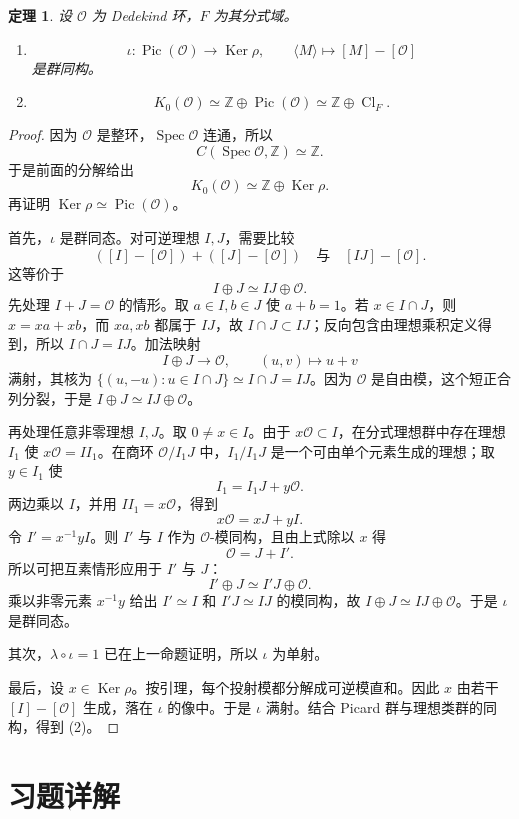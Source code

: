 \documentclass[11pt,a4paper,openany]{ctexbook}
\numberwithin{equation}{chapter}
\newcommand{\Z}{\mathbb{Z}}
\newcommand{\Spec}{\operatorname{Spec}}
\newcommand{\Cl}{\operatorname{Cl}}
\newcommand{\Pic}{\operatorname{Pic}}
\newcommand{\Ker}{\operatorname{Ker}}
\theoremstyle{plain}
\newtheorem{theorem}{定理}[chapter]
\theoremstyle{definition}
\theoremstyle{remark}
\begin{document}
\begin{theorem}
设 $\mathcal O$ 为 Dedekind 环，$F$ 为其分式域。
\begin{enumerate}[label=(\arabic*)]
\item
\[
\iota:\Pic(\mathcal O)\to\Ker\rho,\qquad
\langle M\rangle\mapsto[M]-[\mathcal O]
\]
是群同构。
\item
\[
K_0(\mathcal O)\simeq\Z\oplus\Pic(\mathcal O)
\simeq\Z\oplus\Cl_F.
\]
\end{enumerate}
\end{theorem}

\begin{proof}
因为 $\mathcal O$ 是整环，$\Spec\mathcal O$ 连通，所以
\[
C(\Spec\mathcal O,\Z)\simeq\Z.
\]
于是前面的分解给出
\[
K_0(\mathcal O)\simeq\Z\oplus\Ker\rho.
\]
再证明 $\Ker\rho\simeq\Pic(\mathcal O)$。

首先，$\iota$ 是群同态。对可逆理想 $I,J$，需要比较
\[
([I]-[\mathcal O])+([J]-[\mathcal O])
\quad\text{与}\quad
[IJ]-[\mathcal O].
\]
这等价于
\[
I\oplus J\simeq IJ\oplus\mathcal O.
\]
先处理 $I+J=\mathcal O$ 的情形。取 $a\in I,b\in J$ 使 $a+b=1$。若
$x\in I\cap J$，则 $x=xa+xb$，而 $xa,xb$ 都属于 $IJ$，故
$I\cap J\subset IJ$；反向包含由理想乘积定义得到，所以 $I\cap J=IJ$。加法映射
\[
I\oplus J\longrightarrow\mathcal O,\qquad (u,v)\longmapsto u+v
\]
满射，其核为 $\{(u,-u):u\in I\cap J\}\simeq I\cap J=IJ$。因为
$\mathcal O$ 是自由模，这个短正合列分裂，于是
$I\oplus J\simeq IJ\oplus\mathcal O$。

再处理任意非零理想 $I,J$。取 $0\ne x\in I$。由于 $x\mathcal O\subset I$，在分式理想群中存在理想
$I_1$ 使 $x\mathcal O=II_1$。在商环 $\mathcal O/I_1J$ 中，$I_1/I_1J$
是一个可由单个元素生成的理想；取 $y\in I_1$ 使
\[
I_1=I_1J+y\mathcal O.
\]
两边乘以 $I$，并用 $II_1=x\mathcal O$，得到
\[
x\mathcal O=xJ+yI.
\]
令 $I'=x^{-1}yI$。则 $I'$ 与 $I$ 作为 $\mathcal O$-模同构，且由上式除以
$x$ 得
\[
\mathcal O=J+I'.
\]
所以可把互素情形应用于 $I'$ 与 $J$：
\[
I'\oplus J\simeq I'J\oplus\mathcal O.
\]
乘以非零元素 $x^{-1}y$ 给出 $I'\simeq I$ 和 $I'J\simeq IJ$ 的模同构，故
$I\oplus J\simeq IJ\oplus\mathcal O$。于是 $\iota$ 是群同态。

其次，$\lambda\circ\iota=1$ 已在上一命题证明，所以 $\iota$ 为单射。

最后，设 $x\in\Ker\rho$。按引理，每个投射模都分解成可逆模直和。因此 $x$ 由若干 $[I]-[\mathcal O]$ 生成，落在 $\iota$ 的像中。于是 $\iota$ 满射。结合 Picard 群与理想类群的同构，得到 (2)。
\end{proof}

\section*{习题详解}
\end{document}
